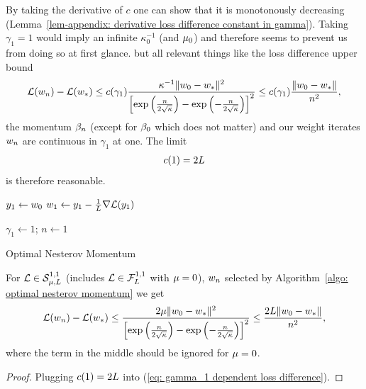 By taking the derivative of \(c\) one can show that it is monotonously
decreasing (Lemma~\ref{lem-appendix: derivative loss difference constant in
gamma}). Taking \(\gamma_1=1\) would imply an infinite
\(\kappa_0^{-1}\) (and \(\mu_0\)) and therefore seems to prevent us from
doing so at first glance. but all relevant things like the loss difference upper
bound
\begin{align}\label{eq: gamma_1 dependent loss difference}
	\mathcal{L}(w_n)-\mathcal{L}(w_*)
	\le c(\gamma_1)
	\frac{\kappa^{-1}\|w_0-w_*\|^2}{\left[
		\exp\left(\frac{n}{2\sqrt{\kappa}}\right)
		-\exp\left(-\frac{n}{2\sqrt{\kappa}}\right)
	\right]^2}
	\le c(\gamma_1)\frac{\|w_0-w_*\|}{n^2},
\end{align}
the momentum \(\beta_n\) (except for \(\beta_0\) which does not
matter) and our weight iterates \(w_n\) are continuous in \(\gamma_1\) at
one. The limit
\begin{align*}
	c(1)=2L
\end{align*}
is therefore reasonable.

\begin{algorithm}
	\(y_1 \leftarrow w_0\)\;
	\(w_1 \leftarrow y_1 - \tfrac{1}{L}\nabla\mathcal{L}(y_1)\)\;

	\(\gamma_1 \leftarrow 1\); \(n\leftarrow 1\)\;
	\caption{Optimal Nesterov Momentum\label{algo: optimal nesterov momentum}}
\end{algorithm}
\begin{corollary}
	For \(\mathcal{L} \in \mathcal{S}^{1,1}_{{\mu},{L}}\) (includes
	\(\mathcal{L}\in\mathcal{F}^{1,1}_{L}\) with \(\mu=0\)), \(w_n\)
	selected by Algorithm~\ref{algo: optimal nesterov momentum}
	we get
	\begin{align*}
		\mathcal{L}(w_n)-\mathcal{L}(w_*)
		\le
		\frac{2\mu\|w_0-w_*\|^2}{\left[
			\exp\left(\frac{n}{2\sqrt{\kappa}}\right)
			-\exp\left(-\frac{n}{2\sqrt{\kappa}}\right)
		\right]^2}
		\le\frac{2L\|w_0-w_*\|}{n^2},
	\end{align*}
	where the term in the middle should be ignored for \(\mu=0\).
\end{corollary}
\begin{proof}
	Plugging \(c(1)=2L\) into (\ref{eq: gamma_1 dependent loss difference}).
\end{proof}

